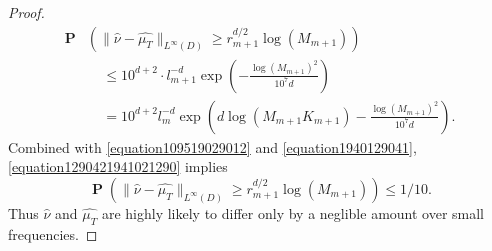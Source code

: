 \documentclass[12pt,reqno]{article}
\DeclareMathOperator{\PP}{\mathbf{P}}
\begin{document}
\begin{proof}
\begin{equation}
\begin{split}
        \PP& \left(\| \widehat{\nu} - \widehat{\mu_T} \|_{L^\infty(D)} \geq r_{m+1}^{d/2} \log(M_{m+1}) \right)\\
        &\ \ \ \ \ \leq 10^{d+2} \cdot l_{m+1}^{-d} \exp \left( - \frac{\log(M_{m+1})^2}{10^7 d} \right)\\
        &\ \ \ \ \ = 10^{d+2} l_m^{-d} \exp \left( d \log(M_{m+1} K_{m+1}) - \frac{\log(M_{m+1})^2}{10^7 d} \right).
    \end{split}
    \end{equation}
    Combined with \eqref{equation109519029012} and \eqref{equation1940129041}, \eqref{equation1290421941021290} implies
    \begin{equation} \label{equation0148912489128}
        \PP \left(\| \widehat{\nu} - \widehat{\mu_T} \|_{L^\infty(D)} \geq r_{m+1}^{d/2} \log(M_{m+1}) \right) \leq 1/10.
    \end{equation}
    Thus $\widehat{\nu}$ and $\widehat{\mu_T}$ are highly likely to differ only by a neglible amount over small frequencies.
\end{proof}
\end{document}
